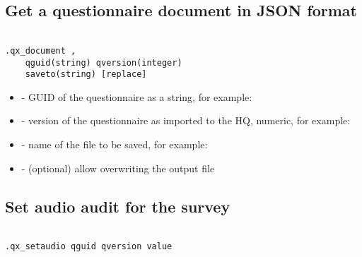 \begin{compactitem}
\end{compactitem}



\subsection{Get a questionnaire document in JSON format}

\begin{lstlisting}[style=CommandLineStyle, showlines=true]

.qx_document ,
    qguid(string) qversion(integer)
    saveto(string) [replace]

\end{lstlisting}

\optsheader
\begin{itemize}

    \item {} - GUID of the questionnaire as a string, for example:

    \item {} - version of the questionnaire as imported
          to the HQ, numeric, for example:

    \item {} - name of the file to be saved, for example:

    \item {} - (optional) allow overwriting the output file

\end{itemize}

\subsection{Set audio audit for the survey}
\begin{lstlisting}[style=CommandLineStyle, showlines=true]

.qx_setaudio qguid qversion value

\end{lstlisting}

